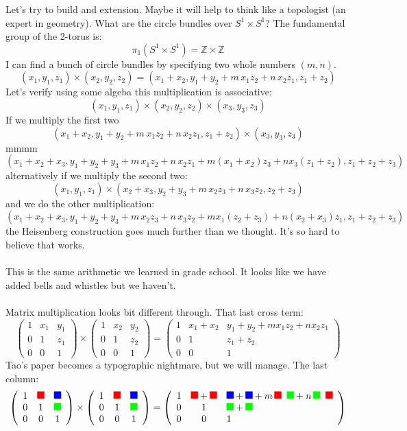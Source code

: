 \documentclass[12pt]{article}
\newcommand{\red}{\begin{tikz}[scale=0.25]
\draw[fill=red, color=red] (0,0)--(1,0)--(1,1)--(0,1)--cycle;\end{tikz}}
\newcommand{\blue}{\begin{tikz}[scale=0.25]
\draw[fill=blue, color=blue] (0,0)--(1,0)--(1,1)--(0,1)--cycle;\end{tikz}}
\newcommand{\green}{\begin{tikz}[scale=0.25]
\draw[fill=green, color=green] (0,0)--(1,0)--(1,1)--(0,1)--cycle;\end{tikz}}
\begin{document}
\noindent Let's try to build and extension.  Maybe it will help to think like a topologist (an expert in geometry).  What are the circle bundles over $S^1 \times S^1 $?  The fundamental group of the 2-torus is:
$$  \pi_1 ( S^1 \times S^1 ) = \mathbb{Z} \times \mathbb{Z} $$
I can find a bunch of circle bundles by specifying two whole numbers $(m,n)$.
$$ (x_1, y_1, z_1) \times (x_2, y_2, z_2) 
= (x_1 + x_2, y_1 + y_2 + m \, x_1 z_2 + n \, x_2 z_1, z_1 + z_2)$$
Let's verify using some algeba this multiplication is associative:
$$ (x_1, y_1, z_1) \times (x_2, y_2, z_2)  \times (x_3, y_3, z_3) $$
If we multiply the first two
$$ (x_1 + x_2, y_1 + y_2 + m \, x_1 z_2 + n \, x_2 z_1, z_1 + z_2) \times (x_3, y_3, z_3) $$
mmmm
$$  (x_1 + x_2 + x_3, y_1 + y_2 +y_3   + m \, x_1 z_2 + n \, x_2 z_1
+ m (x_1 + x_2)z_3 + n x_3 (z_1 + z_2)  , z_1 + z_2+ z_3) $$
alternatively if we multiply the second two:
$$  (x_1, y_1, z_1) \times (x_2 + x_3, y_2 + y_3 + m \, x_2 z_3 + n \, x_3 z_2, z_2 + z_3) $$
and we do the other multiplication:
$$  (x_1 + x_2 + x_3, y_1 + y_2 +y_3   + m \, x_2 z_3 + n \, x_3 z_2
+ m x_1 (z_2 + z_3) + n (x_2 + x_3)z_1  , z_1 + z_2+ z_3) $$
the Heisenberg construction goes much further than we thought.  It's so hard to believe that works. \\ \\
This is the same arithmetic we learned in grade school.  It looks like we have added bells and whistles but we haven't. \\ \\
Matrix multiplication looks  bit different through.  That last cross term:
$$  \left(\begin{array}{ccc} 1 & x_1 & y_1 \\ 
0 & 1 & z_1 \\ 
0 & 0 & 1 \end{array}\right)
\times 
\left(\begin{array}{ccc} 1 & x_2 & y_2 \\ 
0 & 1 & z_2 \\ 
0 & 0 & 1 \end{array}\right) = 
\left(\begin{array}{ccl} 1 & x_1 +x_2 & y_1 + y_2 + mx_1z_2 + n x_2z_1 \\ 
0 & 1 & z_1 +z_2 \\ 
0 & 0 & 1 \end{array}\right)$$
Tao's paper becomes a typographic nightmare, but we will manage.  The last column:
$$  \left(\begin{array}{ccc} 1 & \red  & \blue \\ 
0 & 1 & \green \\ 
0 & 0 & 1 \end{array}\right)
\times 
\left(\begin{array}{ccc} 1 & \red  & \blue \\ 
0 & 1 & \green \\ 
0 & 0 & 1 \end{array}\right) = 
\left(\begin{array}{ccl} 1 & \red + \red & \blue + \blue + m \, \red \;\; \green + n \,\green \;\; \red \\ 
0 & 1 & \green + \green \\ 
0 & 0 & 1 \end{array}\right)$$
\end{document}
